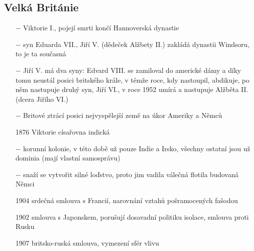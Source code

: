 \documentclass{article}
\begin{document}
\subsection*{Velká Británie}
\begin{itemize}
    \vspace{-0.5em}
    \setlength\itemsep{0.15em}
    \item[$-$] Viktorie I., pojejí smrti končí Hannoverská dynastie
    \item[$-$] syn Eduarda VII., Jiří V. (dědeček Alžbety II.) zakládá dynastii Windsoru, to je ta současná
    \item[$-$] Jiří V. má dva syny: Edvard VIII. se zamiloval do americké dámy a díky tomu neustál posici britského krále, v témže roce, kdy nastoupil, abdikuje, po něm nastupuje druhý syn, Jiří VI., v roce 1952 umírá a nastupuje Alžběta II. (dcera Jiřího VI.)
    \item[$-$] Britové ztrácí posici nejvyspělejší země na úkor Ameriky a Němců
    \item[1876] Viktorie císařovna indická
    \item[$-$] korunní kolonie, v této době už pouze Indie a Irsko, všechny ostatní jsou už dominia (mají vlastní samosprávu)
    \item[$-$] snaží se vytvořit silné loďstvo, proto jim vadila válečná flotila budovaná Němci
    \item[1904] srdečná smlouva s Francií, narovnání vztahů pošramocených fašodou
    \item[1902] smlouva s Japonskem, porušují dosavadní politiku isolace, smlouva proti Rusku
    \item[1907] britsko-ruská smlouva, vymezení sfér vlivu
\end{itemize}
\end{document}
